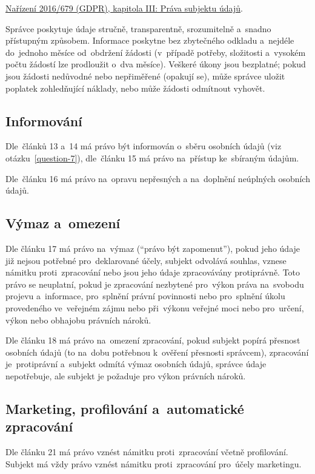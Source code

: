 \href{https://eur-lex.europa.eu/legal-content/CS/TXT/HTML/?uri=CELEX:32016R0679#d1e2150-1-1}{Nařízení 2016/679 (GDPR), kapitola III: Práva subjektu údajů}.

Správce poskytuje údaje stručně, transparentně, srozumitelně a~snadno přístupným způsobem. Informace poskytne bez zbytečného odkladu a~nejdéle do~jednoho měsíce od~obdržení žádosti (v~případě potřeby, složitosti a~vysokém počtu žádostí lze prodloužit o~dva měsíce). Veškeré úkony jsou bezplatné; pokud jsou žádosti nedůvodné nebo nepřiměřené (opakují se), může správce uložit poplatek zohledňující náklady, nebo může žádosti odmítnout vyhovět.

\subsection*{Informování}

Dle~článků 13 a~14 má právo být informován o~sběru osobních údajů (viz otázku~\ref{question-7}), dle~článku 15 má právo na~přístup ke~sbíraným údajům.

Dle~článku 16 má právo na~opravu nepřesných a na~doplnění neúplných osobních údajů.

\subsection*{Výmaz a~omezení}

Dle článku 17 má právo na~výmaz (\enquote{právo být zapomenut}), pokud jeho údaje již nejsou potřebné pro~deklarované účely, subjekt odvolává souhlas, vznese námitku proti~zpracování nebo jsou jeho údaje zpracovávány protiprávně. Toto právo se neuplatní, pokud je zpracování nezbytené pro~výkon práva na~svobodu projevu a~informace, pro~splnění právní povinnosti nebo pro~splnění úkolu provedeného ve~veřejném zájmu nebo při~výkonu veřejné moci nebo pro~určení, výkon nebo obhajobu právních nároků.

Dle článku 18 má právo na~omezení zpracování, pokud subjekt popírá přesnost osobních údajů (to na~dobu potřebnou k~ověření přesnosti správcem), zpracování je~protiprávní a~subjekt odmítá výmaz osobních údajů, správce údaje nepotřebuje, ale subjekt je požaduje pro výkon právních nároků.

\subsection*{Marketing, profilování a~automatické zpracování}

Dle článku 21 má právo vznést námitku proti~zpracování včetně profilování. Subjekt má vždy právo vznést námitku proti~zpracování pro~účely marketingu.

